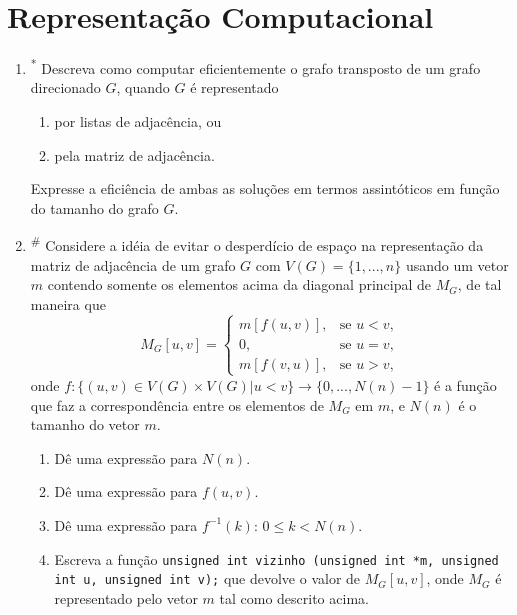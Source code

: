 \section{Representação Computacional} 

\begin{enumerate}[label=\textbf{\arabic*.}, ref=\arabic*, resume]
    \item\textsuperscript{*} Descreva como computar eficientemente o grafo transposto de um grafo direcionado $G$, quando $G$ é representado 
    \begin{enumerate}
        \item por listas de adjacência, ou 
        \item pela matriz de adjacência.
    \end{enumerate}
    Expresse a eficiência de ambas as soluções em termos assintóticos em função do tamanho do grafo $G$. 
    
    \item\textsuperscript{\#} Considere a idéia de evitar o desperdício de espaço na representação da matriz de adjacência de um grafo $G$ com $V(G)=\{1,...,n\}$ usando um vetor $m$ contendo somente os elementos acima da diagonal principal de $M_{G}$, de tal maneira que
    \begin{equation*}
    M_{G}[u,v]=\begin{cases}m[f(u,v)],&\text{se } u<v,\\ 0,&\text{se } u=v,\\ m[f(v,u)],&\text{se } u>v,\end{cases} 
    \end{equation*}
    onde $f:\{(u,v)\in V(G)\times V(G)|u<v\}\rightarrow\{0,...,N(n)-1\}$ é a função que faz a correspondência entre os elementos de $M_{G}$ em $m$, e $N(n)$ é o tamanho do vetor $m$. 
    \begin{enumerate}
        \item Dê uma expressão para $N(n)$. 
        \item Dê uma expressão para $f(u,v)$. 
        \item Dê uma expressão para $f^{-1}(k)$: $0\le k<N(n)$. 
        \item Escreva a função \texttt{unsigned int vizinho (unsigned int *m, unsigned int u, unsigned int v);} que devolve o valor de $M_{G}[u,v]$, onde $M_{G}$ é representado pelo vetor $m$ tal como descrito acima. 
    \end{enumerate}
    

\end{enumerate}
